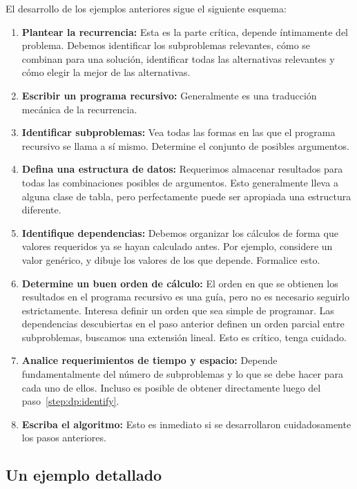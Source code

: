   El desarrollo de los ejemplos anteriores
  sigue el siguiente esquema:
  \begin{enumerate}[font = \textbf, label = {(\alph*)}]
  \item \textbf{Plantear la recurrencia:}
    Esta es la parte crítica,
    depende íntimamente del problema.
    Debemos identificar los subproblemas relevantes,
    cómo se combinan para una solución,
    identificar todas las alternativas relevantes
    y cómo elegir la mejor de las alternativas.
  \item \textbf{Escribir un programa recursivo:}
    Generalmente es una traducción mecánica de la recurrencia.
  \item \textbf{Identificar subproblemas:}
    \label{step:dp:identify}
    Vea todas las formas en las que el programa recursivo se llama a sí mismo.
    Determine el conjunto de posibles argumentos.
  \item \textbf{Defina una estructura de datos:}
    Requerimos almacenar resultados para todas las combinaciones posibles
    de argumentos.
    Esto generalmente lleva a alguna clase de tabla,
    pero perfectamente puede ser apropiada una estructura diferente.
  \item \textbf{Identifique dependencias:}
    Debemos organizar los cálculos de forma que valores requeridos
    ya se hayan calculado antes.
    Por ejemplo,
    considere un valor genérico,
    y dibuje los valores de los que depende.
    Formalice esto.
  \item \textbf{Determine un buen orden de cálculo:}
    El orden en que se obtienen los resultados
    en el programa recursivo es una guía,
    pero no es necesario seguirlo estrictamente.
    Interesa definir un orden que sea simple de programar.
    Las dependencias descubiertas en el paso anterior
    definen un orden parcial entre subproblemas,
    buscamos una extensión lineal.
    Esto es crítico,
    tenga cuidado.
  \item \textbf{Analice requerimientos de tiempo y espacio:}
    Depende fundamentalmente del número de subproblemas
    y lo que se debe hacer para cada uno de ellos.
    Incluso es posible de obtener directamente
    luego del paso~\ref{step:dp:identify}.
  \item \textbf{Escriba el algoritmo:}
    Esto es inmediato si se desarrollaron cuidadosamente los pasos anteriores.
  \end{enumerate}

\subsection{Un ejemplo detallado}
\label{sec:dp-example}

